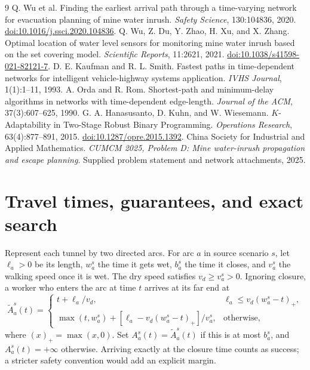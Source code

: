 \documentclass[11pt,a4paper]{article}
\begin{document}
\begin{thebibliography}{9}\small
{} Q. Wu et al. Finding the earliest arrival path through a time-varying network for evacuation planning of mine water inrush. \emph{Safety Science}, 130:104836, 2020. \href{https://doi.org/10.1016/j.ssci.2020.104836}{doi:10.1016/j.ssci.2020.104836}.
 Q. Wu, Z. Du, Y. Zhao, H. Xu, and X. Zhang. Optimal location of water level sensors for monitoring mine water inrush based on the set covering model. \emph{Scientific Reports}, 11:2621, 2021. \href{https://doi.org/10.1038/s41598-021-82121-7}{doi:10.1038/s41598-021-82121-7}.
 D. E. Kaufman and R. L. Smith. Fastest paths in time-dependent networks for intelligent vehicle-highway systems application. \emph{IVHS Journal}, 1(1):1--11, 1993.
 A. Orda and R. Rom. Shortest-path and minimum-delay algorithms in networks with time-dependent edge-length. \emph{Journal of the ACM}, 37(3):607--625, 1990.
 G. A. Hanasusanto, D. Kuhn, and W. Wiesemann. $K$-Adaptability in Two-Stage Robust Binary Programming. \emph{Operations Research}, 63(4):877--891, 2015. \href{https://doi.org/10.1287/opre.2015.1392}{doi:10.1287/opre.2015.1392}.
 China Society for Industrial and Applied Mathematics. \emph{CUMCM 2025, Problem D: Mine water-inrush propagation and escape planning}. Supplied problem statement and network attachments, 2025.
\end{thebibliography}
\clearpage
\appendix
\section{Travel times, guarantees, and exact search}\label{app:math}
Represent each tunnel by two directed arcs. For arc $a$ in source scenario $s$, let $\ell_a>0$ be its length, $w_a^s$ the time it gets wet, $b_a^s$ the time it closes, and $v_a^s$ the walking speed once it is wet. The dry speed satisfies $v_d\ge v_a^s>0$. Ignoring closure, a worker who enters the arc at time $t$ arrives at its far end at
\[
 \widetilde A_a^s(t)=
 \begin{cases}
 t+\ell_a/v_d,&\ell_a\le v_d(w_a^s-t)_+,\\
 \max(t,w_a^s)+[\ell_a-v_d(w_a^s-t)_+]/v_a^s,&\text{otherwise},
 \end{cases}
\]
where $(x)_+=\max(x,0)$. Set $A_a^s(t)=\widetilde A_a^s(t)$ if this is at most $b_a^s$, and $A_a^s(t)=+\infty$ otherwise. Arriving exactly at the closure time counts as success; a stricter safety convention would add an explicit margin.
\end{document}
